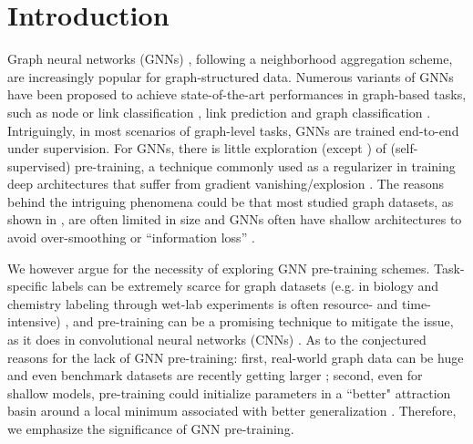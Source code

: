\section{Introduction} \label{introduction}
Graph neural networks (GNNs) \cite{kipf2016semi,velivckovic2017graph,xu2018powerful}, following a neighborhood aggregation scheme, are increasingly popular for graph-structured data. Numerous variants of GNNs have been proposed to  achieve state-of-the-art performances in graph-based tasks, such as node or link classification \cite{kipf2016semi,velivckovic2017graph,you2020l2,liu2020towards,zou2019layer}, link prediction \cite{zhang2018link} and graph classification \cite{ying2018hierarchical,xu2018powerful}. Intriguingly, in most scenarios of graph-level tasks, GNNs are trained end-to-end under supervision.  For GNNs,  there is little exploration (except \cite{hu2019pre}) of (self-supervised) pre-training, a technique commonly used as a regularizer in training deep architectures that suffer from gradient vanishing/explosion \cite{erhan2009difficulty,glorot2010understanding}. The reasons behind the intriguing phenomena could be that most studied graph datasets, as shown in \cite{dwivedi2020benchmarking}, are often limited in size and GNNs often have shallow architectures to avoid over-smoothing \cite{li2018deeper} or ``information loss'' \cite{oono2019graph}.  

We however argue for the necessity of exploring GNN pre-training schemes.  Task-specific labels can be extremely scarce for graph datasets (e.g. in biology and chemistry labeling through wet-lab experiments is often resource- and time-intensive) \cite{zitnik2018prioritizing,hu2019pre}, and pre-training can be a promising technique to mitigate the issue, as it does in convolutional neural networks (CNNs) \cite{goyal2019scaling,kolesnikov2019revisiting,chen2020simple}.  As to the conjectured reasons for the lack of GNN pre-training: first, real-world graph data can be huge and even benchmark datasets are recently getting larger \cite{dwivedi2020benchmarking,hu2020obg}; second, even for shallow models, pre-training could initialize parameters in a ``better" attraction basin  around a local minimum associated with better generalization \cite{glorot2010understanding}. 
Therefore, we emphasize the significance of GNN pre-training.

